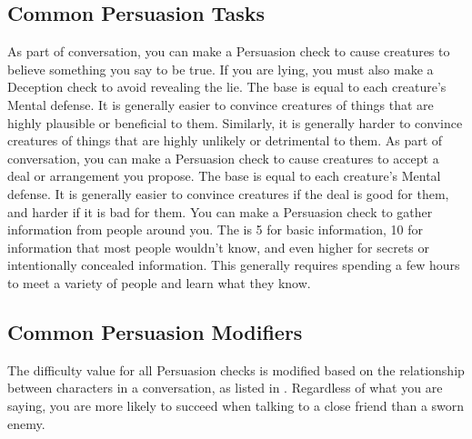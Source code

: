     \subsection{Common Persuasion Tasks}
         As part of conversation, you can make a Persuasion check to cause creatures to believe something you say to be true.
        If you are lying, you must also make a Deception check to avoid revealing the lie.
        The base  is equal to each creature's Mental defense.
        It is generally easier to convince creatures of things that are highly plausible or beneficial to them.
        Similarly, it is generally harder to convince creatures of things that are highly unlikely or detrimental to them.
         As part of conversation, you can make a Persuasion check to cause creatures to accept a deal or arrangement you propose.
        The base  is equal to each creature's Mental defense.
        It is generally easier to convince creatures if the deal is good for them, and harder if it is bad for them.
         You can make a Persuasion check to gather information from people around you.
        The  is 5 for basic information, 10 for information that most people wouldn't know, and even higher for secrets or intentionally concealed information.
        This generally requires spending a few hours to meet a variety of people and learn what they know.

    \subsection{Common Persuasion Modifiers}
        The difficulty value for all Persuasion checks is modified based on the relationship between characters in a conversation, as listed in .
        Regardless of what you are saying, you are more likely to succeed when talking to a close friend than a sworn enemy.


